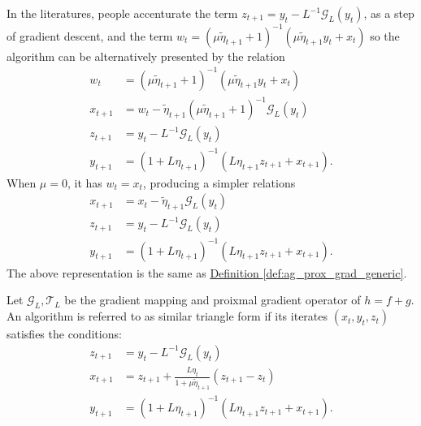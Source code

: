 \documentclass[12pt]{article}
\begin{document}
        \begin{remark}\label{remark:generic_s-cvx_ppm_alternative_representation}
            In the literatures, people accenturate the term $z_{t + 1} = y_t - L^{-1} \mathcal G_L(y_t)$, as a step of gradient descent, and the term $w_t = (\mu\tilde \eta_{t + 1} + 1)^{-1}(\mu\tilde \eta_{t + 1}y_t + x_t)$ so the algorithm can be alternatively presented by the relation 
            \begin{align*}
                w_{t} &= (\mu\tilde \eta_{t + 1} + 1)^{-1}(\mu \tilde \eta_{t + 1} y_t + x_t) 
                \\
                x_{t + 1}&= w_t - \tilde \eta_{t + 1}(\mu\tilde \eta_{t + 1} + 1)^{-1} \mathcal G_L(y_t)
                \\
                z_{t + 1}&= y_t - L^{-1}\mathcal G_L(y_t)
                \\
                y_{t + 1} &= (1 + L\eta_{t + 1})^{-1}(L\eta_{t + 1}z_{t + 1} + x_{t + 1}). 
            \end{align*}
            When $\mu = 0$, it has $w_t = x_t$, producing a simpler relations 
            \begin{align*}
                x_{t + 1} &= 
                x_t - \tilde \eta_{t + 1} \mathcal G_L(y_t)
                \\
                z_{t + 1}&= y_t - L^{-1}\mathcal G_L(y_t)
                \\
                y_{t + 1} &= (1 + L\eta_{t + 1})^{-1}
                (L\eta_{t + 1} z_{t + 1} + x_{t + 1}). 
            \end{align*}
            The above representation is the same as 
            \hyperref[def:ag_prox_grad_generic]{Definition \ref*{def:ag_prox_grad_generic}}. 

        \end{remark}
        
        \begin{definition}\label{def:s-cvx_similar_triangle_form}
            Let $\mathcal G_L, \mathcal T_L$ be the gradient mapping and proixmal gradient operator of $h = f + g$. 
            An algorithm is referred to as similar triangle form if its iterates $(x_t, y_t, z_t)$ satisfies the conditions: 
            \begin{align*}
                z_{t + 1} &= 
                y_t - L^{-1}\mathcal G_L(y_t)
                \\
                x_{t + 1}&= 
                z_{t + 1} + \frac{L\eta_t}{1 + \mu\tilde \eta_{t + 1}}(z_{t + 1} - z_t)
                \\
                y_{t + 1}&= 
                (1 + L\eta_{t + 1})^{-1} (L\eta_{t + 1}z_{t + 1} + x_{t + 1}). 
            \end{align*}
        \end{definition}
\end{document}
